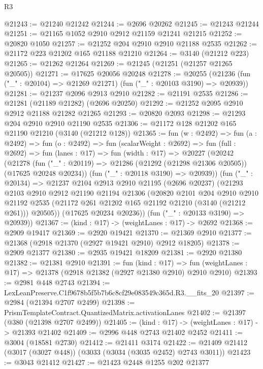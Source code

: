\begin{lexlean}{R3}
\begin{coremodule}
@21243 := @21240 @21242
@21244 := @2696 @20262
@21245 := @21243 @21244
@21251 := @21165 @1052 @2910 @2912 @21159 @21241 @21215
@21252 := @20820 @1050
@21257 := @21252 @204 @2910 @2910 @21188 @2535
@21262 := @21172 @223 @21202 @165 @21188 @21210
@21264 := @3140 (@21212 @223)
@21265 := @21262 @21264
@21269 := @21245 (@21251 (@21257 @21265 @20505))
@21271 := @17625 @20056 @20248
@21278 := @20255 (@21236 (fun ("_" : @20104) => @21269 @21271) (fun ("_" : @20103 @3190) => @20939))
@21281 := @21237 @2096 @2913 @2910
@21282 := @21191 @2535
@21286 := @21281 (@21189 @21282) (@2696 @20250)
@21292 := @21252 @2095 @2910 @2912 @21188 @21282 @21265
@21293 := @20820 @2093
@21298 := @21293 @204 @2910 @2910 @21190 @2535
@21306 := @21172 @128 @21202 @165 @21190 @21210 (@3140 (@21212 @128))
@21365 := fun (w : @2492) =>
  fun (a : @2492) =>
  fun (o : @2492) =>
  fun (scalarWeight : @2692) =>
  fun (full : @2692) =>
  fun (lanes : @17) =>
  fun (width : @17) =>
  @20227
    (@20242
      (@21278
        (fun ("_" : @20119) => @21286 (@21292 (@21298 @21306 @20505)) (@17625 @20248 @20234))
        (fun ("_" : @20118 @3190) => @20939))
      (fun ("_" : @20134) =>
      @21237
        @2104
        @2913
        @2910
        @21195
        (@2696 @20237)
        (@21293
          @2103
          @2910
          @2912
          @21190
          @21194
          @21306
          (@20820
            @2101
            @204
            @2910
            @2910
            @21192
            @2535
            (@21172 @261 @21202 @165 @21192 @21210 (@3140 (@21212 @261)))
            @20505))
        (@17625 @20234 @20236))
      (fun ("_" : @20133 @3190) => @20939))
@21367 := (kind : @17) -> (weightLanes : @17) -> @2692
@21368 := @2909 @19417
@21369 := @2920 @19421
@21370 := @21369 @2910
@21377 := @21368 (@2918 @21370 (@2927 @19421 @2910) @2912 @18205)
@21378 := @2909 @21377
@21380 := @2935 @19421 @18209
@21381 := @2920 @21380
@21382 := @21381 @2910
@21391 := fun (kind : @17) =>
  fun (weightLanes : @17) => @21378 (@2918 @21382 (@2927 @21380 @2910) @2910 @2910)
@21393 := @2981 @448 @2743
@21394 := LexLeanPreserve.C1f9678b5f5b7b6c8cf29e083549c365d.R3.__fits_20
@21397 := @2984 (@21394 @2707 @2499)
@21398 := PrismTemplateContract.QuantizedMatrix.activationLanes
@21402 := @21397 (@380 (@21398 @2707 @2499))
@21405 := (kind : @17) -> (weightLanes : @17) -> @21393 @21402
@21409 := @2996 @448 @2743 @21402 @2452
@21411 := @3004 (@18581 @2730)
@21412 := @21411 @3174
@21422 := @21409 @21412 (@3017 (@3027 @448)) (@3033 (@3034 (@3035 @2452) @2743 @3011))
@21423 := @3043 @21412
@21427 := @21423 @2448 @1255 @202 @21377

\end{coremodule}
\end{lexlean}

